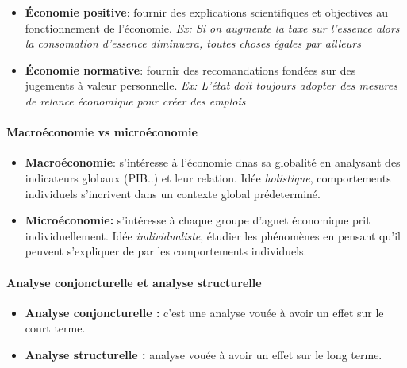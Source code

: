 \begin{itemize}[label= ]
	\item \textbf{Économie positive}: fournir des explications scientifiques et objectives au fonctionnement de l'économie. \emph{Ex: Si on augmente la taxe sur l'essence alors la consomation d'essence diminuera, toutes choses égales par ailleurs}
	\item \textbf{Économie normative}: fournir des recomandations fondées sur des jugements à valeur personnelle.
	 \emph{Ex: L'état doit toujours adopter des mesures de relance économique pour créer des emplois}
\end{itemize}

\paragraph{Macroéconomie vs microéconomie} %
\label{par:macroeconomie_vs_microeconomie}

\begin{itemize}[label= ]
	\item \textbf{Macroéconomie}: s'intéresse à l'économie dnas sa globalité en analysant des indicateurs globaux (PIB..) et leur relation. Idée \emph{holistique}, comportements individuels s'incrivent dans un contexte global prédeterminé.
	\item  \textbf{Microéconomie:} s'intéresse à chaque groupe d'agnet économique prit individuellement. Idée \emph{individualiste}, étudier les phénomènes en pensant qu'il peuvent s'expliquer de par les comportements individuels.
\end{itemize}


\paragraph{Analyse conjoncturelle et analyse structurelle} %
\label{par:analyse_conjoncturelle_et_analyse_structurelle}

\begin{itemize}[label= ]
	\item \textbf{Analyse conjoncturelle : }c'est une analyse vouée à avoir un effet sur le court terme.
	\item \textbf{Analyse structurelle :} analyse vouée à avoir un effet sur le long terme.
\end{itemize}

